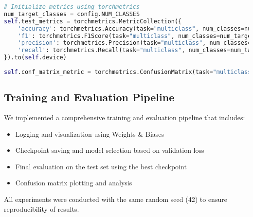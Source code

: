 \begin{lstlisting}[language=Python, caption=Evaluation Metrics Implementation]
# Initialize metrics using torchmetrics
num_target_classes = config.NUM_CLASSES
self.test_metrics = torchmetrics.MetricCollection({
    'accuracy': torchmetrics.Accuracy(task="multiclass", num_classes=num_target_classes),
    'f1': torchmetrics.F1Score(task="multiclass", num_classes=num_target_classes, average='weighted'),
    'precision': torchmetrics.Precision(task="multiclass", num_classes=num_target_classes, average='weighted'),
    'recall': torchmetrics.Recall(task="multiclass", num_classes=num_target_classes, average='weighted')
}).to(self.device)
        
self.conf_matrix_metric = torchmetrics.ConfusionMatrix(task="multiclass", num_classes=num_target_classes).to(self.device)
\end{lstlisting}

\subsection{Training and Evaluation Pipeline}

We implemented a comprehensive training and evaluation pipeline that includes:
\begin{itemize}
    \item Logging and visualization using Weights \& Biases
    \item Checkpoint saving and model selection based on validation loss
    \item Final evaluation on the test set using the best checkpoint
    \item Confusion matrix plotting and analysis
\end{itemize}

All experiments were conducted with the same random seed (42) to ensure reproducibility of results. 